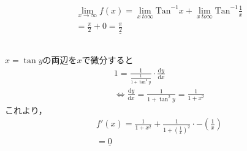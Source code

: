 \documentclass[dvipdfmx]{article}
\begin{document}
\section{}
  \subsection{}
    \begin{align*}
      \lim_{x \to \infty} f(x) = \lim_{x \ to \infty} \mathrm{Tan}^{-1} x + \lim_{x \ to \infty} \mathrm{Tan}^{-1} \frac{1}{x}\\
      = \frac{\pi}{2} + 0 = \underline{\frac{\pi}{2}}
    \end{align*}
  \subsection{}
    $x = \tan y$の両辺を$x$で微分すると
    \begin{align*}
      1 = \frac{1}{\frac{1}{1 + \tan^2 y}} \cdot \frac{\mathrm{d}y}{\mathrm{d}x}\\
      \Leftrightarrow \frac{\mathrm{d}y}{\mathrm{d}x} = \frac{1}{1 +\tan^2 y} = \frac{1}{1 + x^2}
    \end{align*}
    これより，
    \begin{align*}
      f'(x) = \frac{1}{1 + x^2} + \frac{1}{1+\left(\frac{1}{x}\right)^2}\cdot -\left(\frac{1}{x}\right)\\
      = \underline{0}
    \end{align*}
\end{document}
